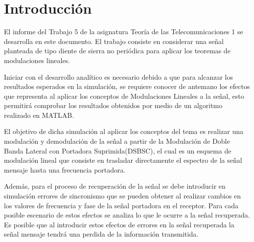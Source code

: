 \section{Introducción}%
\label{sec:introduccion}

El informe del Trabajo 5 de la asignatura Teoría de las Telecomunicaciones 1 se desarrolla en este documento. El trabajo consiste en considerar una señal planteada de tipo diente de sierra no periódica para aplicar los teoremas de modulaciones lineales.

Iniciar con el desarrollo analítico es necesario debido a que para alcanzar los resultados esperados en la simulación, se requiere conocer de antemano los efectos que representa al aplicar los conceptos de Modulaciones Lineales a la señal, esto permitirá comprobar los resultados obtenidos por medio de un algoritmo realizado en MATLAB.

El objetivo de dicha simulación al aplicar los conceptos del tema es realizar una modulación y demodulación de la señal a partir de la Modulación de Doble Banda Lateral con Portadora Suprimida(DSBSC), el cual es un esquema de modulación lineal que consiste en trasladar directamente el espectro de la señal mensaje hasta una frecuencia portadora.

Además, para el proceso de recuperación de la señal se debe introducir en simulación errores de sincronismo que se pueden obtener al realizar cambios en los valores de frecuencia y fase de la señal portadora en el receptor. Para cada posible escenario de estos efectos se analiza lo que le ocurre a la señal recuperada. Es posible que al introducir estos efectos de errores en la señal recuperada la señal mensaje tendrá una  perdida de la información transmitida.
